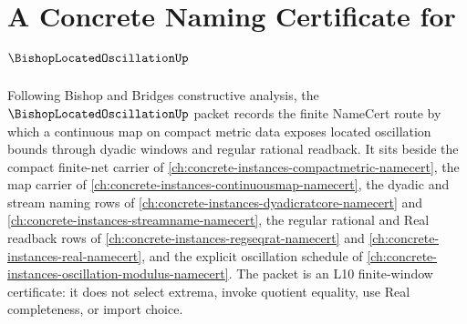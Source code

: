 \chapter{A Concrete Naming Certificate for $\BishopLocatedOscillationUp$}
\label{ch:concrete-instances-bishop-located-oscillation-namecert}

Following Bishop and Bridges constructive analysis, the $\BishopLocatedOscillationUp$ packet records the finite NameCert route by which a continuous map on compact metric data exposes located oscillation bounds through dyadic windows and regular rational readback. It sits beside the compact finite-net carrier of \autoref{ch:concrete-instances-compactmetric-namecert}, the map carrier of \autoref{ch:concrete-instances-continuousmap-namecert}, the dyadic and stream naming rows of \autoref{ch:concrete-instances-dyadicratcore-namecert} and \autoref{ch:concrete-instances-streamname-namecert}, the regular rational and Real readback rows of \autoref{ch:concrete-instances-regseqrat-namecert} and \autoref{ch:concrete-instances-real-namecert}, and the explicit oscillation schedule of \autoref{ch:concrete-instances-oscillation-modulus-namecert}. The packet is an L10 finite-window certificate: it does not select extrema, invoke quotient equality, use Real completeness, or import choice.

